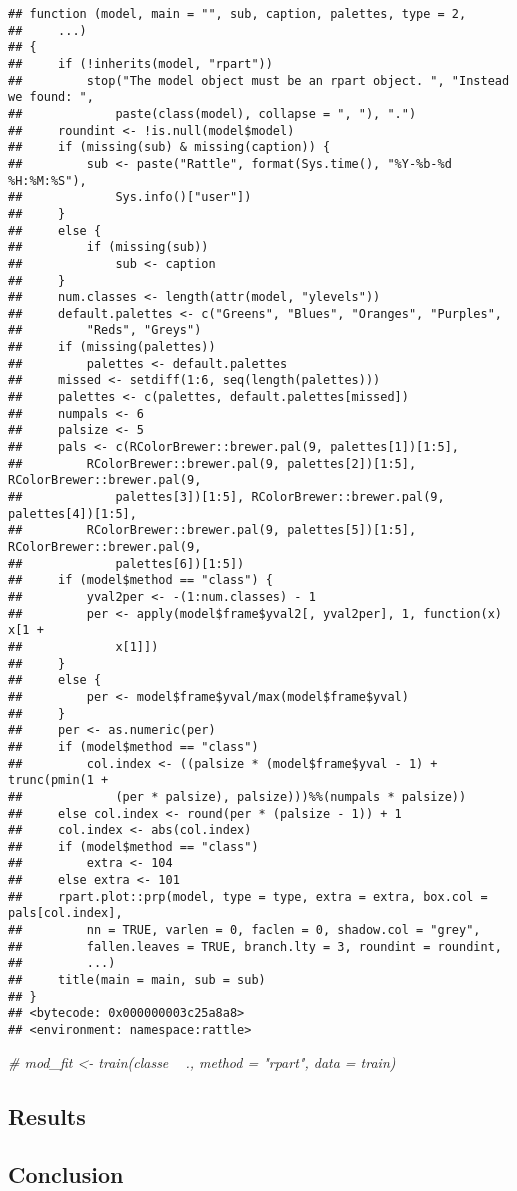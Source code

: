 \documentclass[]{tufte-handout}
\newenvironment{Shaded}{}{}
\newcommand{\CommentTok}[1]{\textcolor[rgb]{0.38,0.63,0.69}{\textit{#1}}}
\begin{document}
\begin{verbatim}
## function (model, main = "", sub, caption, palettes, type = 2, 
##     ...) 
## {
##     if (!inherits(model, "rpart")) 
##         stop("The model object must be an rpart object. ", "Instead we found: ", 
##             paste(class(model), collapse = ", "), ".")
##     roundint <- !is.null(model$model)
##     if (missing(sub) & missing(caption)) {
##         sub <- paste("Rattle", format(Sys.time(), "%Y-%b-%d %H:%M:%S"), 
##             Sys.info()["user"])
##     }
##     else {
##         if (missing(sub)) 
##             sub <- caption
##     }
##     num.classes <- length(attr(model, "ylevels"))
##     default.palettes <- c("Greens", "Blues", "Oranges", "Purples", 
##         "Reds", "Greys")
##     if (missing(palettes)) 
##         palettes <- default.palettes
##     missed <- setdiff(1:6, seq(length(palettes)))
##     palettes <- c(palettes, default.palettes[missed])
##     numpals <- 6
##     palsize <- 5
##     pals <- c(RColorBrewer::brewer.pal(9, palettes[1])[1:5], 
##         RColorBrewer::brewer.pal(9, palettes[2])[1:5], RColorBrewer::brewer.pal(9, 
##             palettes[3])[1:5], RColorBrewer::brewer.pal(9, palettes[4])[1:5], 
##         RColorBrewer::brewer.pal(9, palettes[5])[1:5], RColorBrewer::brewer.pal(9, 
##             palettes[6])[1:5])
##     if (model$method == "class") {
##         yval2per <- -(1:num.classes) - 1
##         per <- apply(model$frame$yval2[, yval2per], 1, function(x) x[1 + 
##             x[1]])
##     }
##     else {
##         per <- model$frame$yval/max(model$frame$yval)
##     }
##     per <- as.numeric(per)
##     if (model$method == "class") 
##         col.index <- ((palsize * (model$frame$yval - 1) + trunc(pmin(1 + 
##             (per * palsize), palsize)))%%(numpals * palsize))
##     else col.index <- round(per * (palsize - 1)) + 1
##     col.index <- abs(col.index)
##     if (model$method == "class") 
##         extra <- 104
##     else extra <- 101
##     rpart.plot::prp(model, type = type, extra = extra, box.col = pals[col.index], 
##         nn = TRUE, varlen = 0, faclen = 0, shadow.col = "grey", 
##         fallen.leaves = TRUE, branch.lty = 3, roundint = roundint, 
##         ...)
##     title(main = main, sub = sub)
## }
## <bytecode: 0x000000003c25a8a8>
## <environment: namespace:rattle>
\end{verbatim}

\begin{Shaded}
\begin{Highlighting}[]
\CommentTok{# mod_fit <- train(classe ~ ., method = "rpart", data = train)}
\end{Highlighting}
\end{Shaded}

\hypertarget{results}{%
\subsection{Results}\label{results}}

\hypertarget{conclusion}{%
\subsection{Conclusion}\label{conclusion}}
\end{document}
